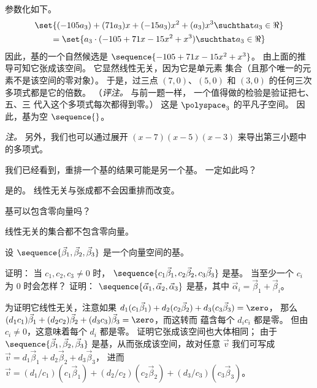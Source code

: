 \begin{exercises}
\begin{answer}
\begin{exparts}
          参数化如下。
          \begin{multline*}
            \set{(-105a_3)+(71a_3)x+(-15a_3)x^2+(a_3)x^3\suchthat a_3\in\Re} \\
            =
            \set{a_3\cdot(-105+71x-15x^2+x^3)\suchthat a_3\in\Re}
          \end{multline*}
          因此，基的一个自然候选是
          $\sequence{-105+71x-15x^2+x^3}$。
          由上面的推导可知它张成该空间。
          它显然线性无关，因为它是单元素
          集合（且那个唯一的元素不是该空间的零对象）。
          于是，过三点 $(7,0)$、$(5,0)$ 和
          $(3,0)$ 的任何三次多项式都是它的倍数。
          （\textit{评注。}
          与前一题一样，
          一个值得做的检验是验证把七、五、三
          代入这个多项式每次都得到零。）
        \partsitem 这是 $\polyspace_3$ 的平凡子空间。
          因此，基为空 $\sequence{}$。
      \end{exparts}
      \noindent\textit{注。}
      另外，我们也可以通过展开 $(x-7)(x-5)(x-3)$
      来导出第三小题中的多项式。
     \end{answer}
  \item
     我们已经看到，重排一个基的结果可能是另一个基。
     一定如此吗？
    \begin{answer}
      是的。
      线性无关与张成都不会因重排而改变。
    \end{answer}
  \item
    基可以包含零向量吗？
    \begin{answer}
      线性无关的集合都不包含零向量。
    \end{answer}
  \recommended \item
    设 \( \sequence{\vec{\beta}_1,\vec{\beta}_2,\vec{\beta}_3} \)
    是一个向量空间的基。
    \begin{exparts}
      \partsitem 证明：
        当 \( c_1, c_2, c_3\neq 0 \) 时，
        \( \sequence{c_1\vec{\beta}_1,c_2\vec{\beta}_2,c_3\vec{\beta}_3} \)
        是基。
        当至少一个 \( c_i \) 为 $0$ 时会怎样？
      \partsitem 证明：
        \( \sequence{\vec{\alpha}_1,\vec{\alpha}_2,\vec{\alpha}_3} \)
        是基，其中 \( \vec{\alpha}_i=\vec{\beta}_1+\vec{\beta}_i \)。
    \end{exparts}
    \begin{answer}
      \begin{exparts}
         \partsitem 为证明它线性无关，注意如果
           \( d_1(c_1\vec{\beta}_1)+d_2(c_2\vec{\beta}_2)+d_3(c_3\vec{\beta}_3)
               =\zero \)，
           那么
           \( (d_1c_1)\vec{\beta}_1+(d_2c_2)\vec{\beta}_2+(d_3c_3)\vec{\beta}_3
               =\zero \)，而这转而
           蕴含每个 \( d_ic_i \) 都是零。
           但由 \( c_i\neq 0 \)，这意味着每个 \( d_i \) 都是零。
           证明它张成该空间也大体相同；
           由于 $\sequence{\vec{\beta}_1,\vec{\beta}_2,\vec{\beta}_3}$
           是基，从而张成该空间，故对任意 $\vec{v}$ 我们可写成
           \( \vec{v}=d_1\vec{\beta}_1+d_2\vec{\beta}_2+d_3\vec{\beta}_3 \)，
           进而
           \( \vec{v}=(d_1/c_1)(c_1\vec{\beta}_1)
               +(d_2/c_2)(c_2\vec{\beta}_2)+(d_3/c_3)(c_3\vec{\beta}_3) \)。


\end{exparts}
\end{answer}
\end{exercises}
